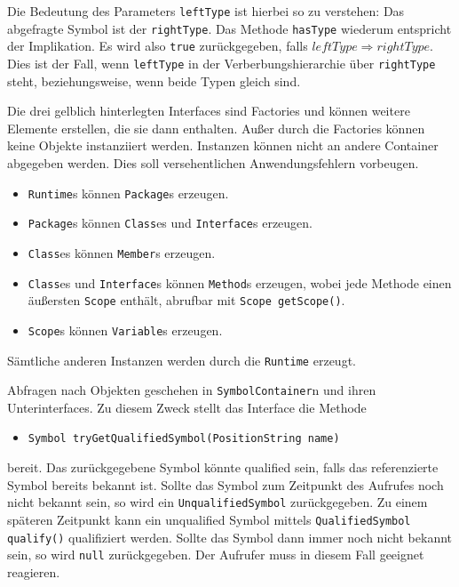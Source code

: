 \documentclass[10pt,a4paper,ngerman,titlepage,tocindentauto]{scrartcl}
\begin{document}
			Die Bedeutung des Parameters \texttt{leftType} ist hierbei so zu verstehen: Das abgefragte Symbol ist der
			\texttt{rightType}. Das Methode \texttt{hasType} wiederum entspricht der Implikation. Es wird also
			\texttt{true} zurückgegeben, falls $leftType\Rightarrow rightType$. Dies ist der Fall, wenn \texttt{leftType}
			in der Verberbungshierarchie über \texttt{rightType} steht, beziehungsweise, wenn beide Typen gleich sind.
			
			Die drei gelblich hinterlegten Interfaces sind Factories und können weitere Elemente erstellen, die
			sie dann enthalten. Außer durch die Factories können keine Objekte instanziiert werden. Instanzen können
			nicht an andere Container abgegeben werden. Dies soll versehentlichen Anwendungsfehlern vorbeugen.
			\begin{itemize}
				\item \texttt{Runtime}s können \texttt{Package}s erzeugen.
				\item \texttt{Package}s können \texttt{Class}es und \texttt{Interface}s erzeugen.
				\item \texttt{Class}es können \texttt{Member}s erzeugen.
				\item \texttt{Class}es und \texttt{Interface}s können \texttt{Method}s erzeugen, wobei jede Methode einen äußersten
					\texttt{Scope} enthält, abrufbar mit \texttt{Scope getScope()}.
				\item \texttt{Scope}s können \texttt{Variable}s erzeugen.
			\end{itemize}
			Sämtliche anderen Instanzen werden durch die \texttt{Runtime} erzeugt.
			
			Abfragen nach Objekten geschehen in \texttt{SymbolContainer}n und ihren Unterinterfaces. Zu diesem Zweck
			stellt das Interface die Methode
			\begin{itemize}
				\item \verb|Symbol tryGetQualifiedSymbol(PositionString name)|
			\end{itemize}
			bereit. Das zurückgegebene Symbol könnte qualified sein, falls das referenzierte Symbol bereits bekannt ist.
			Sollte das Symbol zum Zeitpunkt des Aufrufes noch nicht bekannt sein, so wird ein \texttt{UnqualifiedSymbol}
			zurückgegeben. Zu einem späteren Zeitpunkt kann ein unqualified Symbol mittels \texttt{QualifiedSymbol qualify()}
			qualifiziert werden. Sollte das Symbol dann immer noch nicht bekannt sein, so wird \texttt{null} zurückgegeben.
			Der Aufrufer muss in diesem Fall geeignet reagieren.
	
\end{document}
